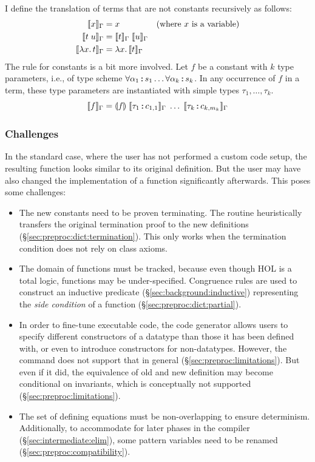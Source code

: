 I define the translation of terms  that are not constants recursively as follows:
\begin{align*}
  \llbracket x\rrbracket_\Gamma &= x &\text{(where $x$ is a variable)} \\
  \llbracket t\;u\rrbracket_\Gamma &= \llbracket t\rrbracket_\Gamma\;\llbracket u\rrbracket_\Gamma \\
  \llbracket\lambda x.\,t\rrbracket_\Gamma &= \lambda x.\,\llbracket t\rrbracket_\Gamma
\end{align*}
The rule for constants is a bit more involved.
Let $f$ be a constant with $k$ type parameters, i.e., of type scheme $\forall \alpha_1 \mathbin{:\!\!:} s_1 \ldots \forall \alpha_k \mathbin{:\!\!:} s_k$.
In any occurrence of $f$ in a term, these type parameters are instantiated with simple types $\tau_1, \ldots, \tau_k$.
\[
  \llbracket f\rrbracket_\Gamma = \llparenthesis f\rrparenthesis\;\llbracket\tau_1 \mathbin{:\!\!:} c_{1,1}\rrbracket_\Gamma\;\ldots\;\llbracket\tau_k \mathbin{:\!\!:} c_{k,m_k}\rrbracket_\Gamma
\]

\subsubsection{Challenges}

In the standard case, where the user has not performed a custom code setup, the resulting function looks similar to its original definition.
But the user may have also changed the implementation of a function significantly afterwards.
This poses some challenges:

\begin{itemize}
  \item
    The new constants need to be proven terminating.
    The routine heuristically transfers the original termination proof to the new definitions (§\ref{sec:preproc:dict:termination}).
    This only works when the termination condition does not rely on class axioms.
  \item
    The domain of functions must be tracked, because even though HOL is a total logic, functions may be under-specified.
    Congruence rules are used to construct an inductive predicate (§\ref{sec:background:inductive}) representing the \emph{side condition} of a function (§\ref{sec:preproc:dict:partial}).
  \item
    In order to fine-tune executable code, the code generator allows users to specify different constructors of a datatype than those it has been defined with, or even to introduce constructors for non-datatypes.
    However, the  command does not support that in general (§\ref{sec:preproc:limitations}).
    But even if it did, the equivalence of old and new definition may become conditional on invariants, which is conceptually not supported (§\ref{sec:preproc:limitations}).
  \item
    The set of defining equations must be non-overlapping to ensure determinism.
    Additionally, to accommodate for later phases in the compiler (§\ref{sec:intermediate:elim}), some pattern variables need to be renamed (§\ref{sec:preproc:compatibility}).
\end{itemize}


